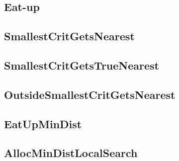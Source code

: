 \subsection{Eat-up}

\subsection{SmallestCritGetsNearest}

\subsection{SmallestCritGetsTrueNearest}

\subsection{OutsideSmallestCritGetsNearest}

\subsection{EatUpMinDist}

\subsection{AllocMinDistLocalSearch}



